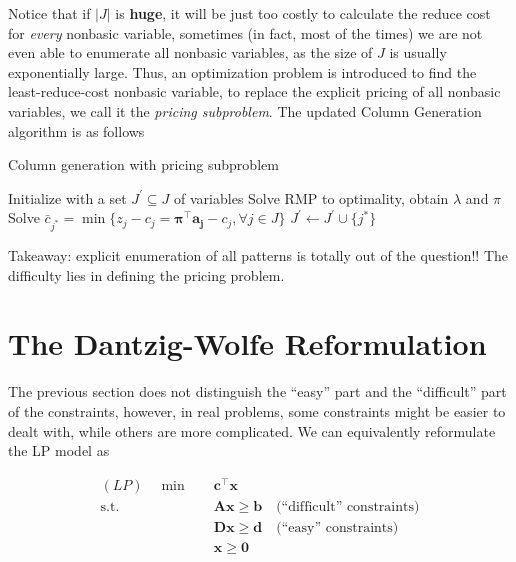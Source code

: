         Notice that if $|J|$ is \textbf{huge}, it will be just too costly to calculate the reduce cost for \textit{every} nonbasic variable, sometimes (in fact, most of the times) we are not even able to enumerate all nonbasic variables, as the size of $J$ is usually exponentially large. Thus, an optimization problem is introduced to find the least-reduce-cost nonbasic variable, to replace the explicit pricing of all nonbasic variables, we call it the \textit{pricing subproblem}. The updated Column Generation algorithm is as follows

        \begin{algorithm}[!htp]
            \centering
            \caption{Column generation with pricing subproblem}
            \begin{algorithmic}
                \State Initialize with a set $J^\prime \subseteq J$ of variables
                \Repeat
                    \State Solve RMP to optimality, obtain $\lambda$ and $\pi$
                    \State Solve $\bar{c}_{j^*} = \min \{z_j - c_j = \mathbf{\pi^\top a_j} - c_j, \forall j \in J\}$
                        \State $J^\prime \gets J^\prime \cup \{j^*\}$
                    \EndIf
            \end{algorithmic}
        \end{algorithm}

        Takeaway: explicit enumeration of all patterns is totally out of the question!! The difficulty lies in defining the pricing problem.

    \section{The Dantzig-Wolfe Reformulation}
        The previous section does not distinguish the ``easy'' part and the ``difficult'' part of the constraints, however, in real problems, some constraints might be easier to dealt with, while others are more complicated. We can equivalently reformulate the LP model as

        \begin{align*}
            (LP) \quad \min \quad & \mathbf{c^\top x}\\
            \text{s.t.} \quad & \mathbf{Ax \ge b} \quad \text{(``difficult'' constraints)}\\
            & \mathbf{Dx \ge d} \quad \text{(``easy'' constraints)} \\
            & \mathbf{x \ge 0}
        \end{align*}

